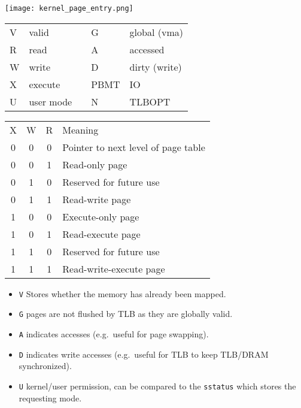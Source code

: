\newpar{}

\begin{center}
    \texttt{[image: kernel\_page\_entry.png]}
\end{center}

\renewcommand{\arraystretch}{1.3}
\setlength{\oldtabcolsep}{\tabcolsep}\setlength\tabcolsep{6pt}

\begin{tabularx}{\linewidth}{@{}llcll@{}}
    V & valid     &  & G    & global (vma)  \\
    R & read      &  & A    & accessed      \\
    W & write     &  & D    & dirty (write) \\
    X & execute   &  & PBMT & IO            \\
    U & user mode &  & N    & TLBOPT
\end{tabularx}

\begin{tabularx}{\linewidth}{@{}cccl@{}}
    X & W & R & Meaning                             \\
    \cmidrule{1-4}
    0 & 0 & 0 & Pointer to next level of page table \\
    0 & 0 & 1 & Read-only page                      \\
    0 & 1 & 0 & Reserved for future use             \\
    0 & 1 & 1 & Read-write page                     \\
    1 & 0 & 0 & Execute-only page                   \\
    1 & 0 & 1 & Read-execute page                   \\
    1 & 1 & 0 & Reserved for future use             \\
    1 & 1 & 1 & Read-write-execute page
\end{tabularx}

\renewcommand{\arraystretch}{1}
\setlength\tabcolsep{\oldtabcolsep}

\begin{itemize}
    \item \texttt{V} Stores whether the memory has already been mapped.
    \item \texttt{G} pages are not flushed by TLB as they are globally valid.
    \item \texttt{A} indicates accesses (e.g.\ useful for page swapping).
    \item \texttt{D} indicates write accesses (e.g.\ useful for TLB to keep TLB/DRAM synchronized).
    \item \texttt{U} kernel/user permission, can be compared to the \texttt{sstatus} which stores the requesting mode.
\end{itemize}

